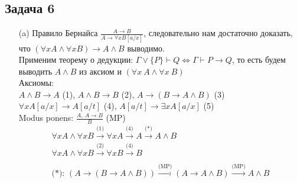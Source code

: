 \subsection*{Задача 6}
\begin{enumerate}
\item[(a)]
	Правило Бернайса $\frac{A \to B}{A \to \forall x B[a/x]}$, следовательно нам достаточно доказать, что $(\forall x A \wedge \forall x B) \to A \wedge B$ выводимо.\\
	Применим теорему о дедукции: $\Gamma \vee \{P\} \vdash Q \Leftrightarrow \Gamma \vdash P \to Q$, то есть будем выводить $A \wedge B$ из аксиом и $(\forall x\ A \wedge \forall x\ B)$\\
	Аксиомы:\\
	$A \wedge B \to A$ (1), $A \wedge B \to B$ (2), $A \to (B \to A \wedge B)$ (3)\\
	$\forall x A[a/x] \to A[a/t]$ (4), $A[a/t] \to \exists x A[a/x]$ (5)\\
	Modus ponens: $\frac{A,\ A \to B}{B}$ (MP)
	\begin{gather*}
		\forall x A \wedge \forall x B \xrightarrow{\text{(1)}}
		\forall x A \xrightarrow{\text{(4)}}
		A \xrightarrow{\text{(*)}}
		A \wedge B
		\\
		\forall x A \wedge \forall x B \xrightarrow{\text{(2)}}
		\forall x B \xrightarrow{\text{(4)}}
		B\\
		\\
		\text{(*): } (A \to (B \to A \wedge B)) \xrightarrow{\text{(MP)}}
		(A \to A \wedge B) \xrightarrow{\text{(MP)}}
		A \wedge B
	\end{gather*}
\begin{comment}
\item[(b)]
	Правило Бернсайса: $\frac{B \to A}{\exists x\ B[a/x] \to A}$, следовательно достаточно доказать, что $A \wedge B \to \exists x [a/x]A \wedge B$ выводимо.\\
	Аналогично по теореме о дедукции выведем $\exists x [a/x] A \wedge B$ из аксиом $A \wedge B$
	\begin{gather*}
		A \wedge B\\
		A \text{ -- (1)}\\
		\exists x [a/x] A \text{ -- (5)}\\
		(B \to \exists x [a/x] A \wedge B) \text{ -- (3)}\\
		\exists x [a/x] A \text{ -- (MP)}\\
		\exists x [a/x] A \wedge B \text{ -- (MP)}
	\end{gather*}
	(в (3) в качестве $A$ выступает $\exists x [a/x] A$, в качестве $B -- B$)
	и
	\begin{gather*}
		A \wedge B\\
		B \text{ -- (2)}
	\end{gather*}
\end{comment}	
\end{enumerate}
\vskip 0.4in

